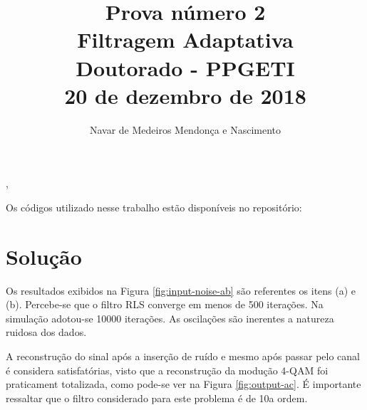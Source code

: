 \documentclass[review]{elsarticle}
\begin{document}
\begin{frontmatter}

\title{Prova número 2 \\ Filtragem Adaptativa \\ Doutorado - PPGETI \\ 20 de dezembro de 2018}

\author[]{Navar de Medeiros Mendonça e Nascimento}
 \sep

\end{frontmatter}


Os códigos utilizado nesse trabalho estão disponíveis no repositório: \url{}

\section{Solução}

Os resultados exibidos na Figura \ref{fig:input-noise-ab} são referentes os itens (a) e (b). Percebe-se que o filtro RLS converge em menos de 500 iterações. Na simulação adotou-se 10000 iterações. As oscilações são inerentes a natureza ruidosa dos dados. 

A reconstrução do sinal após a inserção de ruído e mesmo após passar pelo canal é considera satisfatórias, visto que a reconstrução da modução 4-QAM foi praticament totalizada, como pode-se ver na Figura \ref{fig:output-ac}. É importante ressaltar que o filtro considerado para este problema é de 10a ordem.
\end{document}
